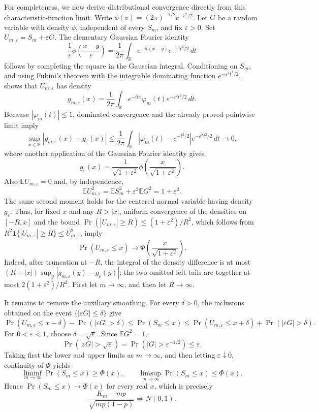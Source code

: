 For completeness, we now derive distributional convergence directly from this characteristic-function limit.  Write \(\phi(v)=(2\pi)^{-1/2}e^{-v^2/2}\).  Let \(G\) be a random variable with density \(\phi\), independent of every \(S_m\), and fix \(\varepsilon>0\).  Set \(U_{m,\varepsilon}=S_m+\varepsilon G\).  The elementary Gaussian Fourier identity
\[
 \frac{1}{\varepsilon}\phi\!\left(\frac{x-y}{\varepsilon}\right)
 =\frac{1}{2\pi}\int_{\mathbb R}
 e^{-it(x-y)}e^{-\varepsilon^2t^2/2}\,dt
\]
follows by completing the square in the Gaussian integral.  Conditioning on \(S_m\), and using Fubini's theorem with the integrable dominating function \(e^{-\varepsilon^2t^2/2}\), shows that \(U_{m,\varepsilon}\) has density
\[
 g_{m,\varepsilon}(x)=\frac{1}{2\pi}\int_{\mathbb R}
 e^{-itx}\varphi_m(t)e^{-\varepsilon^2t^2/2}\,dt.
\]
Because \(|\varphi_m(t)|\leq1\), dominated convergence and the already proved pointwise limit imply
\[
 \sup_{x\in\mathbb R}|g_{m,\varepsilon}(x)-g_{\varepsilon}(x)|
 \leq \frac{1}{2\pi}\int_{\mathbb R}
 |\varphi_m(t)-e^{-t^2/2}|e^{-\varepsilon^2t^2/2}\,dt
 \longrightarrow0,
\]
where another application of the Gaussian Fourier identity gives
\[
 g_{\varepsilon}(x)
 =\frac{1}{\sqrt{1+\varepsilon^2}}
 \phi\!\left(\frac{x}{\sqrt{1+\varepsilon^2}}\right).
\]
Also \(\mathbb E U_{m,\varepsilon}=0\) and, by independence,
\[
 \mathbb E U_{m,\varepsilon}^2
 =\mathbb E S_m^2+\varepsilon^2\mathbb E G^2
 =1+\varepsilon^2.
\]
The same second moment holds for the centered normal variable having density \(g_{\varepsilon}\).  Thus, for fixed \(x\) and any \(R>|x|\), uniform convergence of the densities on \([-R,x]\) and the bound \(\Pr(|U_{m,\varepsilon}|\geq R)\leq(1+\varepsilon^2)/R^2\), which follows from \(R^2\mathbf 1\{|U_{m,\varepsilon}|\geq R\}\leq U_{m,\varepsilon}^2\), imply
\[
 \Pr(U_{m,\varepsilon}\leq x)
 \longrightarrow
 \Phi\!\left(\frac{x}{\sqrt{1+\varepsilon^2}}\right).
\]
Indeed, after truncation at \(-R\), the integral of the density difference is at most \((R+|x|)\sup_y|g_{m,\varepsilon}(y)-g_{\varepsilon}(y)|\); the two omitted left tails are together at most \(2(1+\varepsilon^2)/R^2\).  First let \(m\to\infty\), and then let \(R\to\infty\).

It remains to remove the auxiliary smoothing.  For every \(\delta>0\), the inclusions obtained on the event \(\{|\varepsilon G|\leq\delta\}\) give
\[
 \Pr(U_{m,\varepsilon}\leq x-\delta)-\Pr(|\varepsilon G|>\delta)
 \leq \Pr(S_m\leq x)
 \leq \Pr(U_{m,\varepsilon}\leq x+\delta)+\Pr(|\varepsilon G|>\delta).
\]
For \(0<\varepsilon<1\), choose \(\delta=\sqrt\varepsilon\).  Since \(\mathbb E G^2=1\),
\[
 \Pr(|\varepsilon G|>\sqrt\varepsilon)
 =\Pr(|G|>\varepsilon^{-1/2})\leq\varepsilon.
\]
Taking first the lower and upper limits as \(m\to\infty\), and then letting \(\varepsilon\downarrow0\), continuity of \(\Phi\) yields
\[
 \liminf_{m\to\infty}\Pr(S_m\leq x)
 \geq\Phi(x),
 \qquad
 \limsup_{m\to\infty}\Pr(S_m\leq x)
 \leq\Phi(x).
\]
Hence \(\Pr(S_m\leq x)\to\Phi(x)\) for every real \(x\), which is precisely
\[
 \frac{K_m-mp}{\sqrt{mp(1-p)}}\Rightarrow N(0,1).
\]
